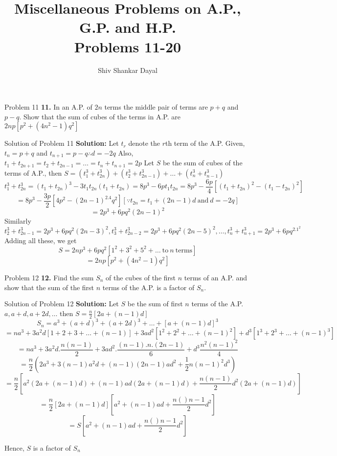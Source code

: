 \documentclass[aspectratio=1610,8pt]{beamer}
\title{Miscellaneous Problems on A.P., G.P. and H.P.\\Problems 11-20}
\author[Shiv Shankar Dayal]{Shiv Shankar Dayal}
\begin{document}
\begin{frame}
  \titlepage
\end{frame}
\begin{frame}{Problem 11}
  \textbf{11.} In an A.P. of $2n$ terms the middle pair of terms are $p + q$ and $p - q.$ Show that the sum of cubes of the terms
  in A.P. are $2np[p^2 + (4n^2 - 1)q^2]$
\end{frame}
\begin{frame}{Solution of Problem 11}
  \textbf{Solution:} Let $t_r$ denote the $r$th term of the A.P.
  \linebreak\linebreak
  Given, $t_n = p + q$ and $t_{n + 1} = p - q \therefore d = -2q$
  \linebreak\linebreak
  Also, $t_1 + t_{2n + 1} = t_2 + t_{2n - 1} = \ldots = t_n + t_{n + 1} = 2p$
  \linebreak\linebreak
  Let $S$ be the sum of cubes of the terms of A.P., then $S = (t_1^3 + t_{2n}^3) + (t_2^3 + t_{2n - 1}^3) + \ldots + (t_n^3 + t_{n
    - 1}^3)$
  $$t_1^3 + t_{2n}^3 = (t_1 + t_{2n})^3 - 3t_1t_{2n}(t_1 + t_{2n}) = 8p^3 - 6pt_1t_{2n} = 8p^3 - \frac{6p}{4}[(t_1 + t_{2n})^2 -
    (t_1 - t_{2n})^2]$$
  $$= 8p^3 - \frac{3p}{2}[4p^2 - (2n - 1)^2.4q^2][\because t_{2n} = t_1 + (2n - 1)d~\text{and}~d = -2q]$$
  $$= 2p^3 + 6pq^2(2n - 1)^2$$
  Similarly $$t_2^3 + t_{2n - 1}^3 = 2p^3 + 6pq^2(2n - 3)^2, t_3^3 + t_{2n - 2}^3 = 2p^3 + 6pq^2(2n - 5)^2, \ldots, t_n^3 + t_{n +
    1}^3 = 2p^3 + 6pq^2.1^2$$
  Adding all these, we get
  $$S = 2np^3 + 6pq^2[1^2 + 3^2 + 5^2 + \ldots~\text{to}~n~\text{terms}]$$
  $$= 2np[p^2 + (4n^2 - 1)q^2]$$
\end{frame}
\begin{frame}{Problem 12}
  \textbf{12.} Find the sum $S_n$ of the cubes of the first $n$ terms of an A.P. and show that the sum of the first $n$ terms of
  the A.P. is a factor of $S_n.$
\end{frame}
\begin{frame}{Solution of Problem 12}
  \textbf{Solution:} Let $S$ be the sum of first $n$ terms of the A.P. $a, a + d, a + 2d, \ldots$ then $S = \frac{n}{2}[2a + (n -
    1)d]$
  $$S_n = a^3 + (a + d)^3 + (a + 2d)^3 + \ldots + [a + (n - 1)d]^3$$
  $$= na^3 + 3a^2d[1 + 2 + 3 + \ldots + (n - 1)] + 3ad^2[1^2 + 2^2 + \ldots + (n - 1)^2] + d^3[1^3 + 2^3 + \ldots + (n - 1)^3]$$
  $$= na^3 + 3a^2d.\frac{n(n - 1)}{2} + 3ad^2.\frac{(n - 1).n.(2n - 1)}{6} + d^3\frac{n^2(n - 1)^2}{4}$$
  $$= \frac{n}{2}\left(2a^3 + 3(n - 1)a^2d + (n - 1)(2n - 1)ad^2 + \frac{1}{2}n(n - 1)^2d^3\right)$$
  $$= \frac{n}{2}\left[a^2(2a + (n - 1)d) + (n - 1)ad(2a + (n - 1)d) + \frac{n(n - 1)}{2}d^2(2a + (n - 1)d)\right]$$
  $$= \frac{n}{2}[2a + (n - 1)d]\left[a^2 + (n - 1)ad + \frac{n()n - 1}{2}d^2\right]$$
  $$= S\left[a^2 + (n - 1)ad + \frac{n()n - 1}{2}d^2\right]$$

  Hence, $S$ is a factor of $S_n$
\end{frame}
\end{document}
